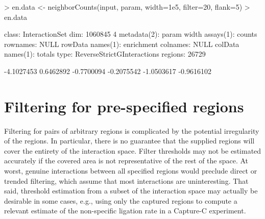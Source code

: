 \documentclass[12pt]{report}
\renewenvironment{Schunk}{\vspace{0pt}}{\vspace{0pt}}
\newcommand{\code}[1]{{\small\texttt{#1}}}
\begin{document}
\begin{Schunk}
\begin{Sinput}
> en.data <- neighborCounts(input, param, width=1e5, filter=20, flank=5)
> en.data
\end{Sinput}
\begin{Soutput}
class: InteractionSet 
dim: 1060845 4 
metadata(2): param width
assays(1): counts
rownames: NULL
rowData names(1): enrichment
colnames: NULL
colData names(1): totals
type: ReverseStrictGInteractions
regions: 26729
\end{Soutput}
\begin{Soutput}
[1] -4.1027453  0.6462892 -0.7700094 -0.2075542 -1.0503617 -0.9616102
\end{Soutput}
\end{Schunk}

% 

\section{Filtering for pre-specified regions}
Filtering for pairs of arbitrary regions is complicated by the potential irregularity of the regions.
In particular, there is no guarantee that the supplied regions will cover the entirety of the interaction space.
Filter thresholds may not be estimated accurately if the covered area is not representative of the rest of the space.
At worst, genuine interactions between all specified regions would preclude direct or trended filtering, which assume that most interactions are uninteresting.
That said, threshold estimation from a subset of the interaction space may actually be desirable in some cases, e.g., using only the captured regions to compute a relevant estimate of the non-specific ligation rate in a Capture-C experiment.
\end{document}
